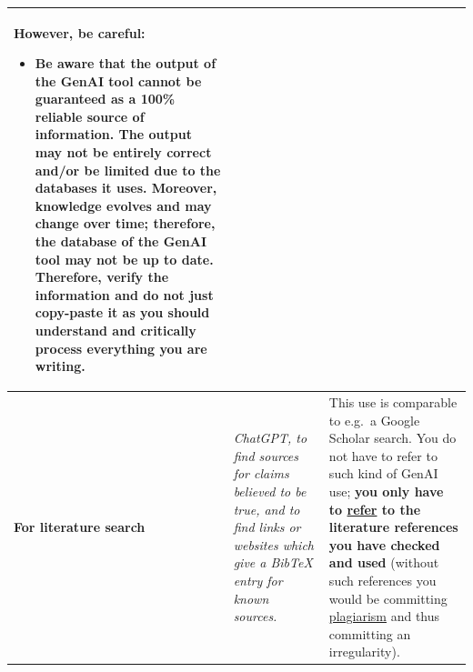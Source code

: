 \begin{longtable}{|p{}|p{}|p{}|}
\textbf{However, be careful:}
\begin{itemize}
    \item Be aware that the output of the GenAI tool cannot be guaranteed as a 100\% reliable source of information. The output may not be entirely correct and/or be limited due to the databases it uses. Moreover, knowledge evolves and may change over time; therefore, the database of the GenAI tool may not be up to date. Therefore, \textbf{verify the information and do not just copy-paste it} as you should understand and critically process everything you are writing.
\end{itemize} \\ \hline
\textbf{For literature search} & \textit{ChatGPT, to find sources for claims believed to be true, and to find links or websites which give a BibTeX entry for known sources.} & This use is comparable to e.g.\ a Google Scholar search. You do not have to refer to such kind of GenAI use; \textbf{you only have to \href{https://bib.kuleuven.be/english/training-and-tutorials/citation}{refer} to the literature references you have checked and used} (without such references you would be committing \href{https://www.kuleuven.be/english/education/plagiarism/index}{plagiarism} and thus committing an irregularity).


\end{longtable}

